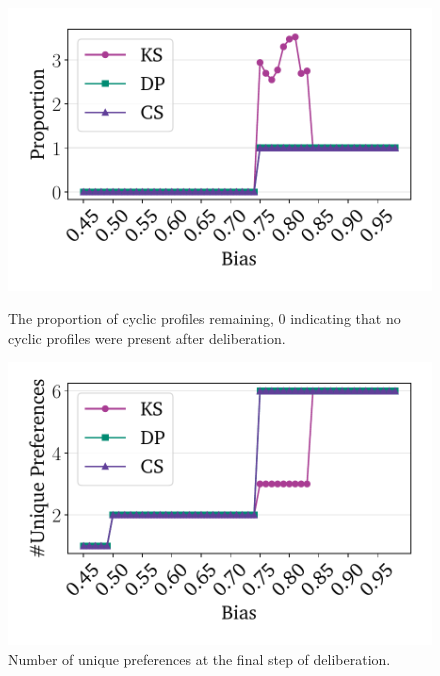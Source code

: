 \begin{figure}[htbp]
	\centering
	\begin{minipage}{0.45\textwidth}
		\centering
		\includegraphics[width=\textwidth]{Figures/cyclic_proportion_Proportion.pdf}
		\caption{The proportion of cyclic profiles remaining, 0 indicating that no cyclic profiles were present after deliberation.}
		\label{fig:rep_cyclic}
	\end{minipage}\hfill
	\begin{minipage}{0.45\textwidth}
		\centering
		\vspace{-9pt}
		\includegraphics[width=\textwidth]{Figures/unique_Unique Preferences.pdf}
		\caption{Number of unique preferences at the final step of deliberation.}
		\label{fig:rep_count}
	\end{minipage}

	\vspace{1em}


\end{figure}
